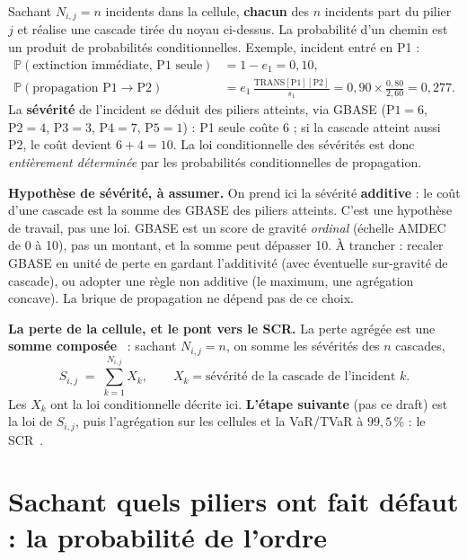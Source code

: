 \documentclass[11pt,a4paper]{article}
\begin{document}
Sachant $N_{i,j}=n$ incidents dans la cellule, \textbf{chacun} des $n$ incidents part du
pilier~$j$ et réalise une cascade tirée du noyau ci-dessus. La probabilité d'un chemin est un
produit de probabilités conditionnelles. Exemple, incident entré en P1 :
\begin{align}
\mathbb P(\text{extinction immédiate, P1 seule}) &= 1-e_1 = 0{,}10, \\
\mathbb P(\text{propagation P1}\to\text{P2}) &= e_1\,\tfrac{\text{TRANS}[\text{P1}][\text{P2}]}{s_1} = 0{,}90\times\tfrac{0{,}80}{2{,}60} = 0{,}277 .
\end{align}
La \textbf{sévérité} de l'incident se déduit des piliers atteints, via GBASE
($\text{P1}=6$, $\text{P2}=4$, $\text{P3}=3$, $\text{P4}=7$, $\text{P5}=1$) : \og{}P1 seule\fg{} coûte $6$ ; si la cascade atteint
aussi P2, le coût devient $6+4=10$. La loi conditionnelle des sévérités est donc
\emph{entièrement déterminée} par les probabilités conditionnelles de propagation.

\noindent\textbf{Hypothèse de sévérité, à assumer.} On prend ici la sévérité \textbf{additive} :
le coût d'une cascade est la somme des GBASE des piliers atteints. C'est une hypothèse de travail,
pas une loi. GBASE est un score de gravité \emph{ordinal} (échelle AMDEC de 0 à 10), pas un
montant, et la somme peut dépasser 10. À trancher : recaler GBASE en unité de perte en gardant
l'additivité (avec éventuelle sur-gravité de cascade), ou adopter une règle non additive (le
maximum, une agrégation concave). La brique de propagation ne dépend pas de ce choix.

\begin{cle}
\textbf{La perte de la cellule, et le pont vers le SCR.} La perte agrégée est une
\textbf{somme composée}~\cite{Buhlmann1970,KlugmanPanjerWillmot} : sachant $N_{i,j}=n$, on somme
les sévérités des $n$ cascades,
\[
S_{i,j} \;=\; \sum_{k=1}^{N_{i,j}} X_k, \qquad
X_k = \text{sévérité de la cascade de l'incident } k .
\]
Les $X_k$ ont la loi conditionnelle décrite ici. \textbf{L'étape suivante} (pas ce draft) est
la loi de $S_{i,j}$, puis l'agrégation sur les cellules et la VaR/TVaR à $99{,}5\,\%$ : le
SCR~\cite{mcneil2015,SolvencyII2009}.
\end{cle}

\section{Sachant quels piliers ont fait défaut : la probabilité de l'ordre}
\end{document}
